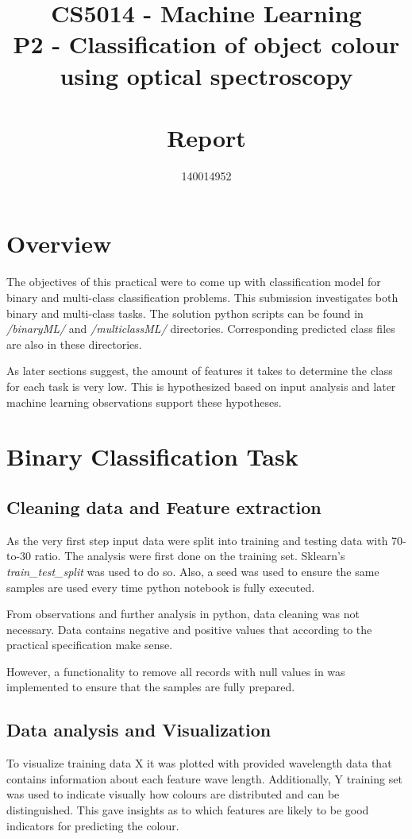 \documentclass[11pt]{article}
\title{CS5014 - Machine Learning 
\\ \vspace{5mm} \Large P2 - Classification of object colour 
\\ using optical spectroscopy 
\\~\\ Report}
\author{140014952}
\begin{document}
	\maketitle

	\section{Overview}

		The objectives of this practical were to come up with classification model for binary and multi-class classification problems. This submission investigates both binary and multi-class tasks. The solution python scripts can be found in \textit{/binaryML/} and \textit{/multiclassML/} directories. Corresponding predicted class files are also in these directories.

		As later sections suggest, the amount of features it takes to determine the class for each task is very low. This is hypothesized based on input analysis and later machine learning observations support these hypotheses. 

	\section{Binary Classification Task}

	\subsection{Cleaning data and Feature extraction}

		As the very first step input data were split into training and testing data with 70-to-30 ratio. The analysis were first done on the training set. Sklearn's \textit{train\_test\_split} was used to do so. Also, a seed was used to ensure the same samples are used every time python notebook is fully executed.

		From observations and further analysis in python, data cleaning was not necessary. Data contains negative and positive values that according to the practical specification make sense. 

		However, a functionality to remove all records with null values in was implemented to ensure that the samples are fully prepared.

	\subsection{Data analysis and Visualization}

		To visualize training data X it was plotted with provided wavelength data that contains information about each feature wave length. Additionally, Y training set was used to indicate visually how colours are distributed and can be distinguished. This gave insights as to which features are likely to be good indicators for predicting the colour. 
\end{document}
